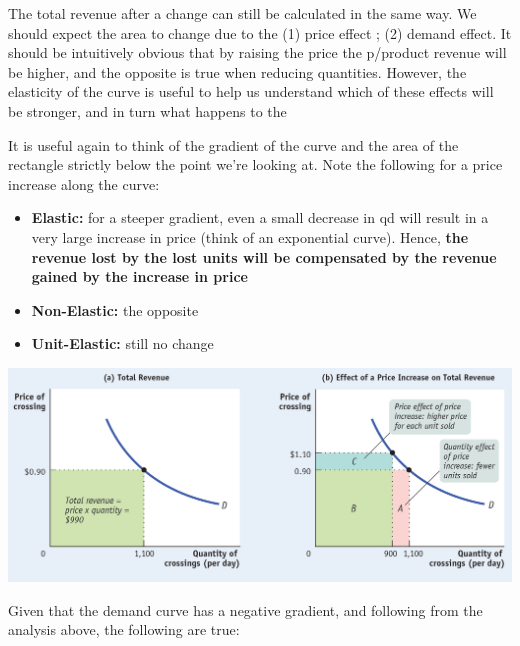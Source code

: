 \documentclass[english,course,draft]{Notes}
\begin{document}
\par{The total revenue after a change can still be calculated in the same way. We should expect the area to change due to the (1) price effect ; (2) demand effect. It should be intuitively obvious that by raising the price the p/product revenue will be higher, and the opposite is true when reducing quantities. However, the elasticity of the curve is useful to help us understand which of these effects will be stronger, and in turn what happens to the }

\par{It is useful again to think of the gradient of the curve and the area of the rectangle strictly below the point we're looking at. Note the following for a price increase along the curve:} 

\begin{itemize}
	\item{\textbf{Elastic:} for a steeper gradient, even a small decrease in qd will result in a very large increase in price (think of an exponential curve). Hence, \textbf{the revenue lost by the lost units will be compensated by the revenue gained by the increase in price}}
	\item{ \textbf{Non-Elastic:} the opposite}
	\item{ \textbf{Unit-Elastic:} still no change}
\end{itemize}

\includegraphics[width=\linewidth]{elasticRev}


\par{Given that the demand curve has a negative gradient, and following from the analysis above, the following are true:}

\end{document}
